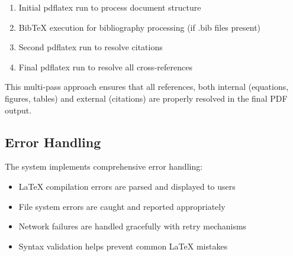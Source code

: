 \begin{enumerate}
    \item Initial pdflatex run to process document structure
    \item BibTeX execution for bibliography processing (if .bib files present)
    \item Second pdflatex run to resolve citations
    \item Final pdflatex run to resolve all cross-references
\end{enumerate}

This multi-pass approach ensures that all references, both internal (equations, figures, tables) and external (citations) are properly resolved in the final PDF output.

\subsection{Error Handling}

The system implements comprehensive error handling:
\begin{itemize}
    \item LaTeX compilation errors are parsed and displayed to users
    \item File system errors are caught and reported appropriately
    \item Network failures are handled gracefully with retry mechanisms
    \item Syntax validation helps prevent common LaTeX mistakes
\end{itemize}